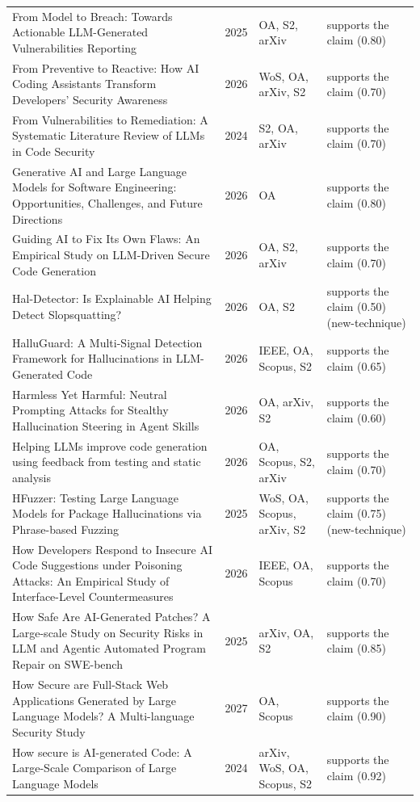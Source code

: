 \begin{longtable}{@{}%
  >{\raggedright\arraybackslash}p{}c%
  >{\raggedright\arraybackslash}p{}%
  >{\raggedright\arraybackslash}p{}@{}}
From Model to Breach: Towards Actionable LLM-Generated Vulnerabilities Reporting & 2025 & OA, S2, arXiv & supports the claim (0.80) \\
From Preventive to Reactive: How AI Coding Assistants Transform Developers' Security Awareness & 2026 & WoS, OA, arXiv, S2 & supports the claim (0.70) \\
From Vulnerabilities to Remediation: A Systematic Literature Review of LLMs in Code Security & 2024 & S2, OA, arXiv & supports the claim (0.70) \\
Generative AI and Large Language Models for Software Engineering: Opportunities, Challenges, and Future Directions & 2026 & OA & supports the claim (0.80) \\
Guiding AI to Fix Its Own Flaws: An Empirical Study on LLM-Driven Secure Code Generation & 2026 & OA, S2, arXiv & supports the claim (0.70) \\
Hal-Detector: Is Explainable AI Helping Detect Slopsquatting? & 2026 & OA, S2 & supports the claim (0.50) (new-technique) \\
HalluGuard: A Multi-Signal Detection Framework for Hallucinations in LLM-Generated Code & 2026 & IEEE, OA, Scopus, S2 & supports the claim (0.65) \\
Harmless Yet Harmful: Neutral Prompting Attacks for Stealthy Hallucination Steering in Agent Skills & 2026 & OA, arXiv, S2 & supports the claim (0.60) \\
Helping LLMs improve code generation using feedback from testing and static analysis & 2026 & OA, Scopus, S2, arXiv & supports the claim (0.70) \\
HFuzzer: Testing Large Language Models for Package Hallucinations via Phrase-based Fuzzing & 2025 & WoS, OA, Scopus, arXiv, S2 & supports the claim (0.75) (new-technique) \\
How Developers Respond to Insecure AI Code Suggestions under Poisoning Attacks: An Empirical Study of Interface-Level Countermeasures & 2026 & IEEE, OA, Scopus & supports the claim (0.70) \\
How Safe Are AI-Generated Patches? A Large-scale Study on Security Risks in LLM and Agentic Automated Program Repair on SWE-bench & 2025 & arXiv, OA, S2 & supports the claim (0.85) \\
How Secure are Full-Stack Web Applications Generated by Large Language Models? A Multi-language Security Study & 2027 & OA, Scopus & supports the claim (0.90) \\
How secure is AI-generated Code: A Large-Scale Comparison of Large Language Models & 2024 & arXiv, WoS, OA, Scopus, S2 & supports the claim (0.92) \\

\end{longtable}

